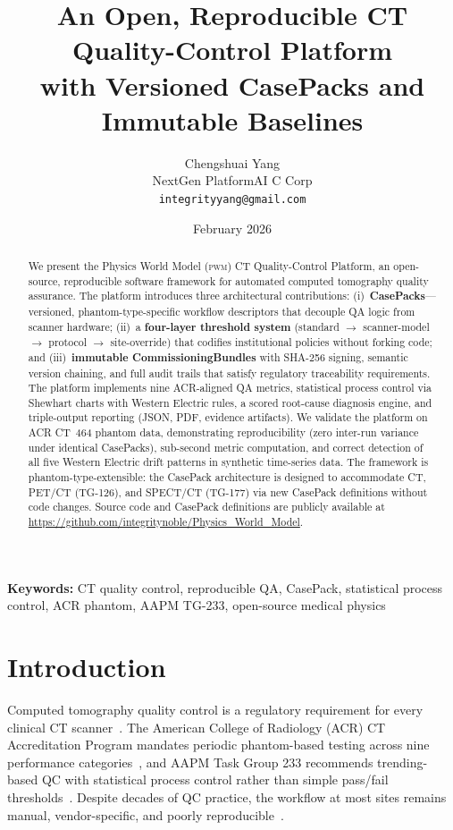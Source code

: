 \documentclass[11pt]{article}
\title{%
  An Open, Reproducible CT Quality-Control Platform\\
  with Versioned CasePacks and Immutable Baselines}
\author{Chengshuai Yang\\
NextGen PlatformAI C Corp\\
\texttt{integrityyang@gmail.com}}
\date{February 2026}
\newcommand{\pwm}{\textsc{pwm}}
\begin{document}
\maketitle
\linenumbers

\begin{abstract}
We present the Physics World Model (\pwm{}) CT Quality-Control Platform,
an open-source, reproducible software framework for automated computed
tomography quality assurance.
The platform introduces three architectural contributions:
(i)~\textbf{CasePacks}---versioned, phantom-type-specific workflow
descriptors that decouple QA logic from scanner hardware;
(ii)~a \textbf{four-layer threshold system} (standard $\to$ scanner-model
$\to$ protocol $\to$ site-override) that codifies institutional policies
without forking code; and
(iii)~\textbf{immutable CommissioningBundles} with SHA-256 signing,
semantic version chaining, and full audit trails that satisfy
regulatory traceability requirements.
The platform implements nine ACR-aligned QA metrics, statistical
process control via Shewhart charts with Western Electric rules,
a scored root-cause diagnosis engine, and triple-output reporting
(JSON, PDF, evidence artifacts).
We validate the platform on ACR CT~464 phantom data,
demonstrating reproducibility (zero inter-run variance under
identical CasePacks), sub-second metric computation, and
correct detection of all five Western Electric drift patterns
in synthetic time-series data.
The framework is phantom-type-extensible: the CasePack architecture
is designed to accommodate CT, PET/CT (TG-126), and SPECT/CT (TG-177)
via new CasePack definitions without code changes.
Source code and CasePack definitions are publicly available at
\url{https://github.com/integritynoble/Physics_World_Model}.
\end{abstract}

\noindent\textbf{Keywords:}
CT quality control, reproducible QA, CasePack, statistical process
control, ACR phantom, AAPM TG-233, open-source medical physics

\section{Introduction}
\label{sec:intro}

Computed tomography quality control is a regulatory requirement for
every clinical CT scanner~\cite{acr_ct_accreditation,aapm_tg233}.
The American College of Radiology (ACR) CT Accreditation Program
mandates periodic phantom-based testing across nine performance
categories~\cite{acr_ct464}, and AAPM Task Group 233 recommends
trending-based QC with statistical process control rather than
simple pass/fail thresholds~\cite{aapm_tg233}.
Despite decades of QC practice, the workflow at most sites remains
manual, vendor-specific, and poorly reproducible~\cite{mccollough2004ct_performance}.
\end{document}
